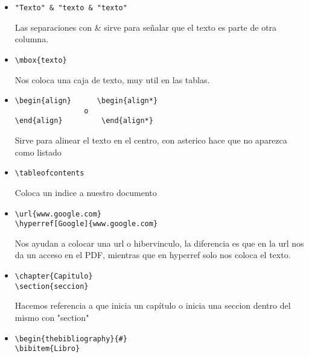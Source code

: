 \documentclass{book}
\begin{document}
\begin{enumerate}
\begin{itemize}
\begin{lstlisting}
\end{array}
		\end{lstlisting} Sirve para tabular tablas\\
		
		\begin{lstlisting}  
\hline  o \hline "texto" \hline
		\end{lstlisting}  Dibuja lineas horizontales a nuestra tabla, si se coloca el texto entre dos de esta lineas se cierra la tabla
		\item 
		\begin{lstlisting}  
"Texto" & "texto & "texto"
		\end{lstlisting} Las separaciones con \& sirve para señalar que el texto es parte de otra columna.
		\item
		\begin{lstlisting}  
\mbox{texto}
		\end{lstlisting} Nos coloca una caja de texto, muy util en las tablas.
		\item
		\begin{lstlisting} 
\begin{align}      \begin{align*}
        		o     
\end{align}         \end{align*}
		\end{lstlisting} Sirve para alinear el texto en el centro, con asterico hace que no aparezca como listado
		\item
		\begin{lstlisting}  
\tableofcontents
		\end{lstlisting} Coloca un indice a nuestro documento
		\item
		\begin{lstlisting} 
\url{www.google.com}
\hyperref[Google]{www.google.com}			
		\end{lstlisting} Nos ayudan a colocar una url o hibervinculo, la diferencia es que en la url nos da un acceso en el PDF, mientras que en hyperref solo nos coloca el texto.
		\item
		\begin{lstlisting} 
\chapter{Capitulo}
\section{seccion}		
		\end{lstlisting} Hacemos referencia a que inicia un capítulo o  inicia una seccion dentro del mismo con "section"
		\item
		\begin{lstlisting} 
\begin{thebibliography}{#}
\bibitem{Libro}
		

\end{lstlisting}
\end{itemize}
\end{enumerate}
\end{document}
